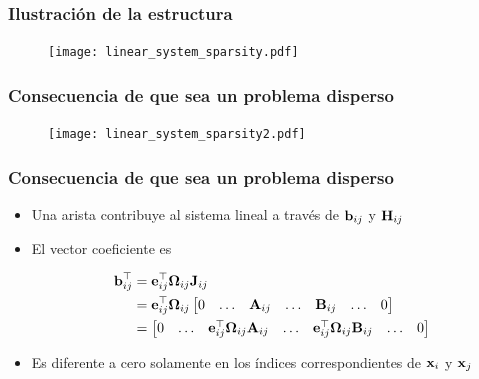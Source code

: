 \begin{frame}
    \frametitle{Ilustración de la estructura}
    
    \begin{figure}[!h]
        \texttt{[image: linear\_system\_sparsity.pdf]}
    \end{figure}
    
\end{frame}

\begin{frame}
    \frametitle{Consecuencia de que sea un problema disperso}
    
     \begin{figure}[!h]
        \texttt{[image: linear\_system\_sparsity2.pdf]}
    \end{figure}
    
\end{frame}

\begin{frame}
    \frametitle{Consecuencia de que sea un problema disperso}
    
    \begin{itemize}
        \item Una arista contribuye al sistema lineal a través de $\boldsymbol{\mathbf{b}}_{ij}$ y $\boldsymbol{\mathbf{H}}_{ij}$
        \item El vector coeficiente es
        
        \begin{align*}
            \boldsymbol{\mathbf{b}}_{ij}^{\top} &= \boldsymbol{\mathbf{e}}_{ij}^{\top}\boldsymbol{\mathbf{\Omega}}_{ij}\boldsymbol{\mathbf{J}}_{ij}\\
            &= \boldsymbol{\mathbf{e}}_{ij}^{\top}\boldsymbol{\mathbf{\Omega}}_{ij}
                \begin{bmatrix}
                    0 & \dots & \boldsymbol{\mathbf{A}}_{ij} & \dots & \boldsymbol{\mathbf{B}}_{ij} & \dots & 0
                \end{bmatrix}\\
            &= 
                \begin{bmatrix}
                    0 & \dots & \boldsymbol{\mathbf{e}}_{ij}^{\top}\boldsymbol{\mathbf{\Omega}}_{ij}\boldsymbol{\mathbf{A}}_{ij} & \dots & \boldsymbol{\mathbf{e}}_{ij}^{\top}\boldsymbol{\mathbf{\Omega}}_{ij}\boldsymbol{\mathbf{B}}_{ij} & \dots & 0
                \end{bmatrix}
        \end{align*}
        \item Es diferente a cero solamente en los índices correspondientes de $\boldsymbol{\mathbf{x}}_{i}$ y $\boldsymbol{\mathbf{x}}_{j}$        
    \end{itemize}
    
\end{frame}

